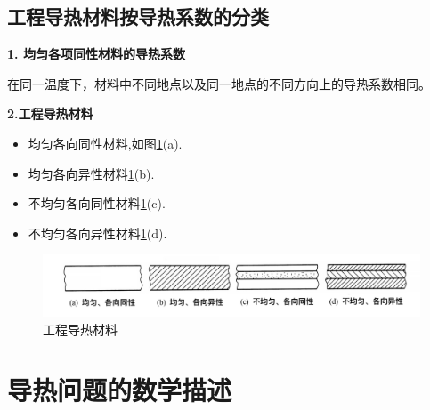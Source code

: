 \subsection{工程导热材料按导热系数的分类}
\noindent \textbf{1. 均匀各项同性材料的导热系数}

在同一温度下，材料中不同地点以及同一地点的不同方向上的导热系数相同。
\vspace*{1em}

\noindent \textbf{2.工程导热材料}\vspace*{-0.5em}
\begin{itemize}
	\item 均匀各向同性材料,如图\ref{工程导热材料}(a).\vspace*{-0.5em}
	\item 均匀各向异性材料\ref{工程导热材料}(b).\vspace*{-0.5em}
	\item 不均匀各向同性材料\ref{工程导热材料}(c).\vspace*{-0.5em}
	\item 不均匀各向异性材料\ref{工程导热材料}(d).
\end{itemize}

\begin{figure}[!htb]
	\centering
	\includegraphics[width=0.9\linewidth]{pic/传热材料分类.jpg}
	\vspace*{-2em}
	\caption{工程导热材料}
	\label{工程导热材料}
\end{figure}

\section{导热问题的数学描述}
